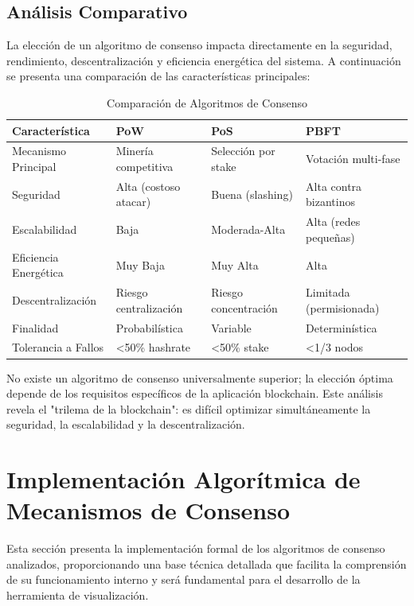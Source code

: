 \documentclass[spanish,12pt,letterpaper]{report}
\begin{document}
\subsection{Análisis Comparativo}

La elección de un algoritmo de consenso impacta directamente en la seguridad, rendimiento, descentralización y eficiencia energética del sistema. A continuación se presenta una comparación de las características principales:

\begin{table}[ht]
\centering
\caption{Comparación de Algoritmos de Consenso}
\begin{tabular}{|l|p{3cm}|p{3cm}|p{3cm}|}
\hline
\textbf{Característica} & \textbf{PoW} & \textbf{PoS} & \textbf{PBFT} \\
\hline
Mecanismo Principal & Minería competitiva & Selección por stake & Votación multi-fase \\
\hline
Seguridad & Alta (costoso atacar) & Buena (slashing) & Alta contra bizantinos \\
\hline
Escalabilidad & Baja & Moderada-Alta & Alta (redes pequeñas) \\
\hline
Eficiencia Energética & Muy Baja & Muy Alta & Alta \\
\hline
Descentralización & Riesgo centralización & Riesgo concentración & Limitada (permisionada) \\
\hline
Finalidad & Probabilística & Variable & Determinística \\
\hline
Tolerancia a Fallos & <50\% hashrate & <50\% stake & <1/3 nodos \\
\hline
\end{tabular}
\end{table}

No existe un algoritmo de consenso universalmente superior; la elección óptima depende de los requisitos específicos de la aplicación blockchain. Este análisis revela el "trilema de la blockchain": es difícil optimizar simultáneamente la seguridad, la escalabilidad y la descentralización.

\section{Implementación Algorítmica de Mecanismos de Consenso}

Esta sección presenta la implementación formal de los algoritmos de consenso analizados, proporcionando una base técnica detallada que facilita la comprensión de su funcionamiento interno y será fundamental para el desarrollo de la herramienta de visualización.
\end{document}

